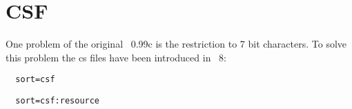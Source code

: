 
\section{CSF}%
\label{sec:csf}%

One problem of the original \BibTeX~0.99c is the restriction to 7 bit
characters. To solve this problem the cs files have been introduced in
\BibTeX~8:

\begin{verbatim}
  sort=csf
\end{verbatim}

\begin{verbatim}
  sort=csf:resource
\end{verbatim}

\INCOMPLETE


\endinput
%
